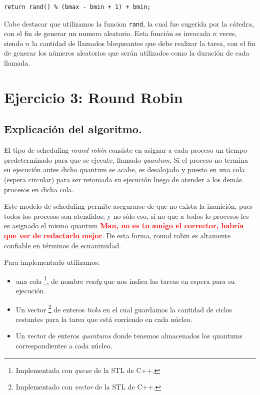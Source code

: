 \documentclass[a4paper]{article}
\begin{document}
\begin{verbatim}
return rand() % (bmax - bmin + 1) + bmin;
\end{verbatim}

Cabe destacar que utilizamos la funcion \verb|rand|, la cual fue sugerida
por la cátedra, con el fin de generar un numero aleatorio. Esta función es
invocada $n$ veces, siendo $n$ la cantidad de llamados bloqueantes que debe
realizar la tarea, con el fin de generar los números aleatorios que serán
utilizados como la duración de cada llamada.


\section{Ejercicio 3: Round Robin}

\subsection{Explicación del algoritmo.}
El tipo de scheduling \textit{round robin} consiste en asignar a cada
proceso un tiempo predeterminado para que se ejecute, llamado
\textit{quantum}. Si el proceso no termina su ejecución antes dicho quantum
se acabe, es desalojado y puesto en una cola (espera circular) para ser
retomada su ejecución luego de atender a los demás procesos en dicha cola.

Este modelo de scheduling permite asegurarse de que no exista la inanición,
pues todos los procesos son atendidos; y no sólo eso, si no que a todos lo
procesos les es asignado el mismo quantum \textbf{\textcolor{red}{Man, no es
tu amigo el corrector, habría que ver de redactarlo mejor}}. De esta
forma, round robin es altamente confiable en términos de ecuanimidad.

Para implementarlo utilizamos:
\begin{itemize}
\item una cola \footnote{Implementada con \textit{queue} de la STL de C++.}, de nombre
\textit{ready} que nos indica las tareas en espera para su ejecución.
\item Un vector \footnote{Implementado con
\textit{vector} de la STL de C++.} de enteros \textit{ticks} en el cual
guardamos la cantidad de ciclos restantes para la tarea que está corriendo
en cada núcleo.
\item Un vector de enteros \textit{quantums} donde tenemos
almacenados los quantums correspondientes a cada núcleo. 
\end{itemize}
\end{document}
